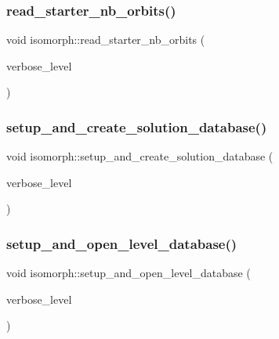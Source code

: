 \mbox{\label{classisomorph_a1102e2f058d18399ce5155ae33b2f00a}} 
\subsubsection{\texorpdfstring{read\+\_\+starter\+\_\+nb\+\_\+orbits()}{read\_starter\_nb\_orbits()}}
{\footnotesize\ttfamily void isomorph\+::read\+\_\+starter\+\_\+nb\+\_\+orbits (\begin{DoxyParamCaption}\item[{\mbox{\hyperlink{galois_8h_a09fddde158a3a20bd2dcadb609de11dc}{I\+NT}}}]{verbose\+\_\+level }\end{DoxyParamCaption})}

\mbox{\label{classisomorph_a810a22dfde3c43272107c743ec819b0e}} 
\subsubsection{\texorpdfstring{setup\+\_\+and\+\_\+create\+\_\+solution\+\_\+database()}{setup\_and\_create\_solution\_database()}}
{\footnotesize\ttfamily void isomorph\+::setup\+\_\+and\+\_\+create\+\_\+solution\+\_\+database (\begin{DoxyParamCaption}\item[{\mbox{\hyperlink{galois_8h_a09fddde158a3a20bd2dcadb609de11dc}{I\+NT}}}]{verbose\+\_\+level }\end{DoxyParamCaption})}

\mbox{\label{classisomorph_aa011f38988f4db9c6f5abd84faebd153}} 
\subsubsection{\texorpdfstring{setup\+\_\+and\+\_\+open\+\_\+level\+\_\+database()}{setup\_and\_open\_level\_database()}}
{\footnotesize\ttfamily void isomorph\+::setup\+\_\+and\+\_\+open\+\_\+level\+\_\+database (\begin{DoxyParamCaption}\item[{\mbox{\hyperlink{galois_8h_a09fddde158a3a20bd2dcadb609de11dc}{I\+NT}}}]{verbose\+\_\+level }\end{DoxyParamCaption})}

